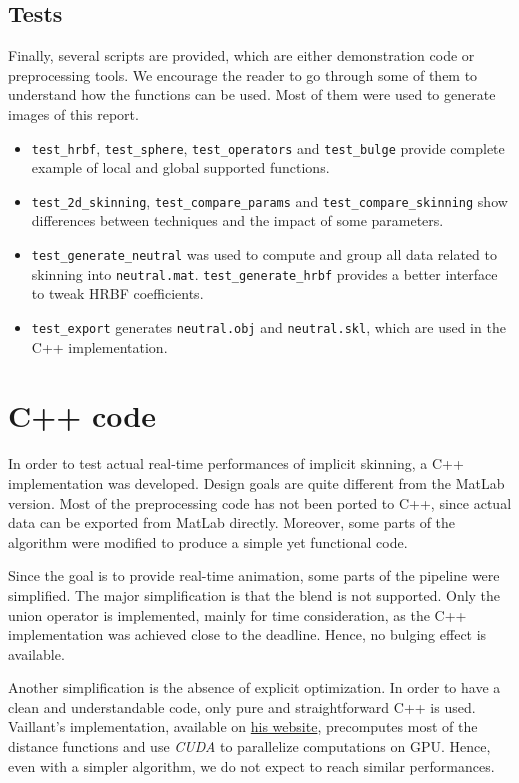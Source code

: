\documentclass[a4paper,10pt]{article}
\begin{document}
\begin{multicols}{2}
\subsection{Tests}

Finally, several scripts are provided, which are either demonstration code or preprocessing tools.
We encourage the reader to go through some of them to understand how the functions can be used.
Most of them were used to generate images of this report.

\begin{itemize}
\item
\lstinline!test_hrbf!, \lstinline!test_sphere!, \lstinline!test_operators! and \lstinline!test_bulge! provide complete example of local and global supported functions.
\item
\lstinline!test_2d_skinning!, \lstinline!test_compare_params! and \lstinline!test_compare_skinning! show differences between techniques and the impact of some parameters.
\item
\lstinline!test_generate_neutral! was used to compute and group all data related to skinning into \lstinline!neutral.mat!.
\lstinline!test_generate_hrbf! provides a better interface to tweak HRBF coefficients.
\item
\lstinline!test_export! generates \lstinline!neutral.obj! and \lstinline!neutral.skl!, which are used in the C++ implementation.
\end{itemize}


\section{C++ code}

\lstset{language=C++}

In order to test actual real-time performances of implicit skinning, a C++ implementation was developed.
Design goals are quite different from the MatLab version.
Most of the preprocessing code has not been ported to C++, since actual data can be exported from MatLab directly.
Moreover, some parts of the algorithm were modified to produce a simple yet functional code.

Since the goal is to provide real-time animation, some parts of the pipeline were simplified.
The major simplification is that the blend is not supported.
Only the union operator is implemented, mainly for time consideration, as the C++ implementation was achieved close to the deadline.
Hence, no bulging effect is available.

Another simplification is the absence of explicit optimization.
In order to have a clean and understandable code, only pure and straightforward C++ is used.
Vaillant's implementation, available on \href{http://rodolphe-vaillant.fr/?e=31}{his website}, precomputes most of the distance functions and use \emph{CUDA} to parallelize computations on GPU.
Hence, even with a simpler algorithm, we do not expect to reach similar performances.



\end{multicols}
\end{document}
